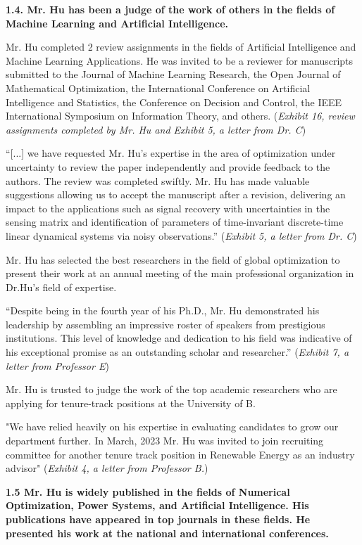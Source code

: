 \documentclass{article}
\begin{document}
{\bf 1.4. Mr. Hu has been a judge of the work of others in the fields of Machine Learning and Artificial Intelligence. }

Mr. Hu completed 2 review assignments in the fields of Artificial Intelligence and Machine Learning Applications. He was invited to be a reviewer for manuscripts submitted to the Journal of Machine Learning Research, the Open Journal of Mathematical Optimization, the International Conference on Artificial Intelligence and Statistics, the Conference on Decision and Control, the IEEE International Symposium on Information Theory, and others. ({\it Exhibit 16, review assignments completed by Mr. Hu and Exhibit 5, a letter from Dr. C})

“[...] we have requested Mr. Hu’s expertise in the area of optimization under uncertainty to review the paper independently and provide feedback to the authors. The review was completed swiftly. Mr. Hu has made valuable suggestions allowing us to accept the manuscript after a revision, delivering an impact to the applications such as signal recovery with uncertainties in the sensing matrix and identification of parameters of time-invariant discrete-time linear dynamical systems via noisy observations.” ({\it Exhibit 5, a letter from Dr. C}) 

Mr. Hu has selected the best researchers in the field of global optimization to present their work at an annual meeting of the main professional organization in Dr.Hu's field of expertise.

“Despite being in the fourth year of his Ph.D., Mr. Hu demonstrated his leadership by assembling an impressive roster of speakers from prestigious institutions. This level of knowledge and dedication to his field was indicative of his exceptional promise as an outstanding scholar and researcher.” ({\it Exhibit 7, a letter from Professor E}) 

Mr. Hu is trusted to judge the work of the top academic researchers who are applying for tenure-track positions at the University of B.

"We have relied heavily on his expertise in evaluating candidates to grow our department further. In March, 2023 Mr. Hu was invited to join recruiting committee for another tenure track position in Renewable Energy as an industry advisor" ({\it Exhibit 4, a letter from Professor B.}) 

{\bf 1.5 Mr. Hu is widely published in the fields of Numerical Optimization, Power Systems, and Artificial Intelligence. His publications have appeared in top journals in these fields. He presented his work at the national and international conferences.}
\end{document}
